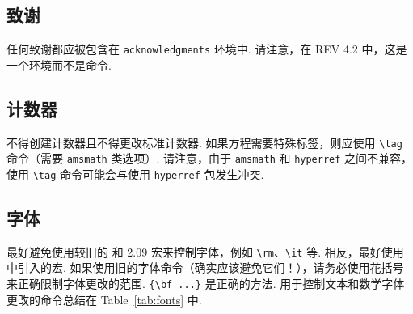 \documentclass[twocolumn, amssymb, bibnotes, aps, prd, 10pt]{revtex4-2}
\newcommand{\revtex}{REV\hologo{TeX}}
\newcommand{\classoption}[1]{\texttt{#1}}
\newcommand{\macro}[1]{\texttt{\textbackslash#1}}
\newcommand{\m}[1]{\macro{#1}}
\newcommand{\env}[1]{\texttt{#1}}
\begin{document}
\subsection{致谢}
任何致谢都应被包含在 \env{acknowledgments} 环境中. 请注意，在 {\revtex} 4.2 中，这是一个环境而不是命令.

\subsection{计数器}
不得创建计数器且不得更改标准计数器. 如果方程需要特殊标签，则应使用 \m{tag} 命令（需要 \classoption{amsmath} 类选项）. 请注意，由于 \classoption{amsmath} 和 \classoption{hyperref} 之间不兼容，使用 \m{tag} 命令可能会与使用 \classoption{hyperref} 包发生冲突.

\subsection{字体}
最好避免使用较旧的 {} 和 {} 2.09 宏来控制字体，例如 \m{rm}、\m{it} 等. 相反，最好使用 {} 中引入的宏. 如果使用旧的字体命令（确实应该避免它们！），请务必使用花括号来正确限制字体更改的范围. \verb+{\bf ...}+ 是正确的方法. 用于控制文本和数学字体更改的命令总结在 Table~\ref{tab:fonts} 中.
\end{document}
